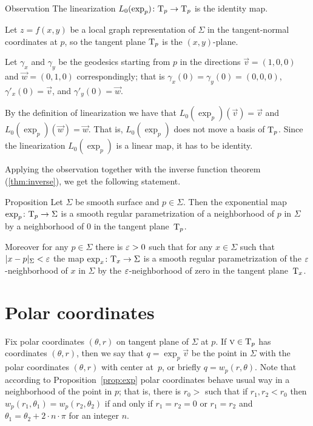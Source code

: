 \begin{thm}{Observation}
The linearization $L_0(\exp_p)\colon\mathrm{T}_p\to \mathrm{T}_p$ is the identity map.
\end{thm}

Let $z=f(x,y)$ be a local graph representation of $\Sigma$ in the tangent-normal coordinates at $p$,
so the tangent plane $\mathrm{T}_p$ is the $(x,y)$-plane. 

Let $\gamma_x$ and $\gamma_y$ be the geodesics starting from $p$ in the directions
$\vec v=(1,0,0)$
and
$\vec w=(0,1,0)$
correspondingly;
that is $\gamma_x(0)=\gamma_y(0)=(0,0,0)$, $\gamma'_x(0)=\vec v$, and $\gamma'_y(0)=\vec w$.

By the definition of linearization we have that $L_0(\exp_p)(\vec v)=\vec v$
and $L_0(\exp_p)(\vec w)=\vec w$.
That is, $L_0(\exp_p)$ does not move a basis of $\mathrm{T}_p$.
Since the linearization $L_0(\exp_p)$ is a linear map,
it has to be identity.
\qeds 

Applying the observation together with the inverse function theorem (\ref{thm:inverse}), we get the following statement. %

\begin{thm}{Proposition}\label{prop:exp}
Let $\Sigma$ be smooth surface and $p\in \Sigma$.
Then the exponential map $\exp_p\colon\mathrm{T}_p\to \Sigma$ is a smooth regular parametrization of a neighborhood of $p$ in $\Sigma$ by a neighborhood of $0$ in the tangent plane~$\mathrm{T}_p$.

Moreover for any $p\in \Sigma$ there is $\varepsilon>0$ such that for any $x\in \Sigma$ such that $|x-p|_\Sigma<\varepsilon$ the map 
$\exp_x\colon\mathrm{T}_x\to \Sigma$ is a smooth regular parametrization of the $\varepsilon$-neighborhood of $x$ in $\Sigma$ by the $\varepsilon$-neighborhood of zero in the tangent plane~$\mathrm{T}_x$. %
\end{thm}

\section*{Polar coordinates}

Fix polar coordinates $(\theta,r)$ on tangent plane of $\Sigma$ at $p$.
If $\textsc v\in \mathrm{T}_p$ has coordinates $(\theta,r)$,
then we say that $q=\exp_p\vec v$ be the point in $\Sigma$ with the polar coordinates $(\theta,r)$ with center at~$p$, or briefly $q=w_p(r,\theta)$.
Note that according to Proposition~\ref{prop:exp} polar coordinates behave usual way in a neighborhood of the point in $p$;
that is, there is $r_0>$ such that if $r_1,r_2<r_0$ then $w_p(r_1,\theta_1) = w_p(r_2,\theta_2)$ if and only if
$r_1=r_2=0$ or $r_1=r_2$ and $\theta_1=\theta_2+2\cdot n\cdot\pi$ for an integer $n$.

